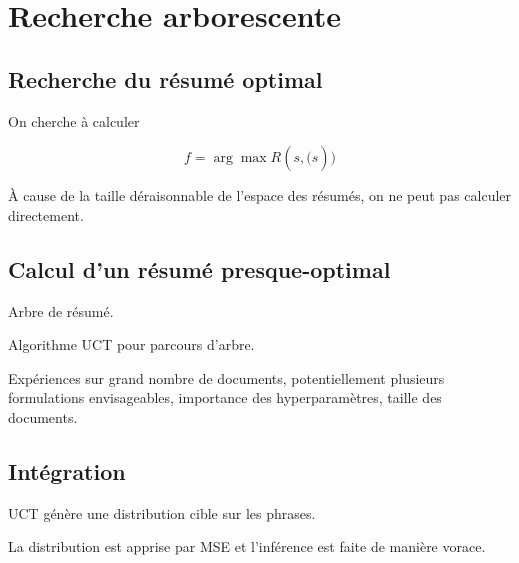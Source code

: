 \chapter{Recherche arborescente}
\label{chap:mcts}                   %

\section{Recherche du résumé optimal}

On cherche à calculer

\begin{equation}
    f = \arg\max R(s, \hat(s))
\end{equation}

À cause de la taille déraisonnable de l'espace des résumés, on ne peut
pas calculer directement.

\section{Calcul d'un résumé presque-optimal}

Arbre de résumé.

Algorithme UCT pour parcours d'arbre.

Expériences sur grand nombre de documents, potentiellement plusieurs
formulations envisageables, importance des hyperparamètres, taille des
documents.

\section{Intégration}

UCT génère une distribution cible sur les phrases.

La distribution est apprise par MSE et l'inférence est faite de manière
vorace.